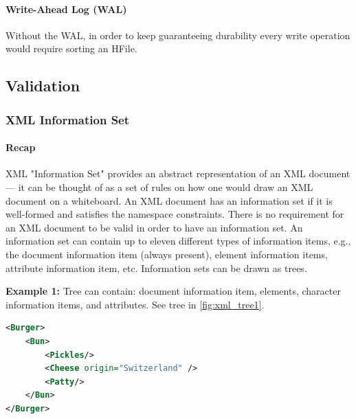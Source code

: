 \paragraph{Write-Ahead Log (WAL)}
Without the WAL, in order to keep guaranteeing durability every write operation would require sorting an HFile.



\subsection{Validation}

\subsubsection{XML Information Set}

\paragraph{Recap}
XML "Information Set" provides an abstract representation of an XML document — it can be thought of as a set of rules on how one would draw an XML document on a whiteboard. An XML document has an information set if it is well-formed and satisfies the namespace constraints. There is no requirement for an XML document to be valid in order to have an information set. An information set can contain up to eleven different types of information items, e.g., the document information item (always present), element information items, attribute information item, etc. Information sets can be drawn as trees.

\textbf{Example 1:} Tree can contain: document information item, elements, character information items, and attributes. See tree in \ref{fig:xml_tree1}.

\begin{lstlisting}[language=XML]
<Burger>
    <Bun>
        <Pickles/>
        <Cheese origin="Switzerland" />
        <Patty/>
    </Bun>
</Burger>
\end{lstlisting}

